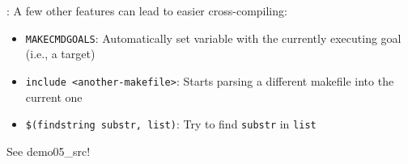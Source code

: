 \begin{frame}{\secname: \small\subsecname\normalsize}
    A few other features can lead to easier cross-compiling:

    \begin{itemize}
        \item \texttt{MAKECMDGOALS}: Automatically set variable with the currently executing goal (i.e., a target)
        \item \texttt{include <another-makefile>}: Starts parsing a different makefile into the current one
        \item \texttt{\$(findstring substr, list)}: Try to find \texttt{substr} in \texttt{list}
    \end{itemize}

    See demo05\_src!
\end{frame}
